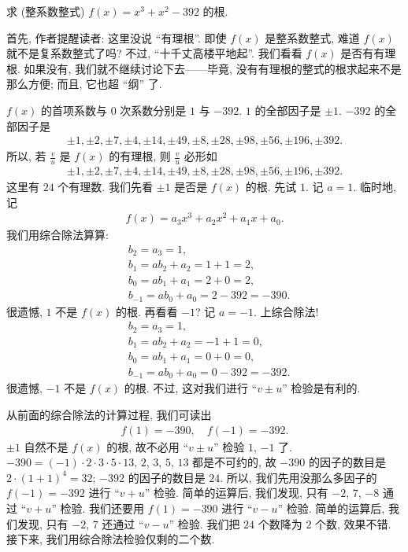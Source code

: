 \begin{example}
    求 (整系数整式) $f(x) = x^3 + x^2 - 392$ 的根.

    首先, 作者提醒读者: 这里没说 ``有理根''. 即使 $f(x)$ 是整系数整式, 难道 $f(x)$ 就不是复系数整式了吗? 不过, ``十千丈高楼平地起''. 我们看看 $f(x)$ 是否有有理根. 如果没有, 我们就不继续讨论下去——毕竟, 没有有理根的整式的根求起来不是那么方便; 而且, 它也超 ``纲'' 了.

    $f(x)$ 的首项系数与 $0$ 次系数分别是 $1$ 与 $-392$. $1$ 的全部因子是 $\pm 1$. $-392$ 的全部因子是
    \begin{align*}
        {\pm 1}, {\pm 2}, {\pm 7}, {\pm 4}, {\pm 14}, {\pm 49}, {\pm 8}, {\pm 28}, {\pm 98}, {\pm 56}, {\pm 196}, {\pm 392}.
    \end{align*}
    所以, 若 $\frac{v}{u}$ 是 $f(x)$ 的有理根, 则 $\frac{v}{u}$ 必形如
    \begin{align*}
        {\pm 1}, {\pm 2}, {\pm 7}, {\pm 4}, {\pm 14}, {\pm 49}, {\pm 8}, {\pm 28}, {\pm 98}, {\pm 56}, {\pm 196}, {\pm 392}.
    \end{align*}
    这里有 $24$ 个有理数. 我们先看 $\pm 1$ 是否是 $f(x)$ 的根. 先试 $1$. 记 $a = 1$. 临时地, 记
    \begin{align*}
        f(x) = a_3 x^3 + a_2 x^2 + a_1 x + a_0.
    \end{align*}
    我们用综合除法算算:
    \begin{align*}
         & b_2 = a_3 = 1,                         \\
         & b_1 = a b_2 + a_2 = 1 + 1 = 2,         \\
         & b_0 = a b_1 + a_1 = 2 + 0 = 2,         \\
         & b_{-1} = a b_0 + a_0 = 2 - 392 = -390.
    \end{align*}
    很遗憾, $1$ 不是 $f(x)$ 的根. 再看看 $-1$? 记 $a = -1$. 上综合除法!
    \begin{align*}
         & b_2 = a_3 = 1,                         \\
         & b_1 = a b_2 + a_2 = -1 + 1 = 0,        \\
         & b_0 = a b_1 + a_1 = 0 + 0 = 0,         \\
         & b_{-1} = a b_0 + a_0 = 0 - 392 = -392.
    \end{align*}
    很遗憾, $-1$ 不是 $f(x)$ 的根. 不过, 这对我们进行 ``$v \pm u$'' 检验是有利的.

    从前面的综合除法的计算过程, 我们可读出
    \begin{align*}
        f(1) = -390, \quad f(-1) = -392.
    \end{align*}
    $\pm 1$ 自然不是 $f(x)$ 的根, 故不必用 ``$v \pm u$'' 检验 $1$, $-1$ 了. $-390 = (-1) \cdot 2 \cdot 3 \cdot 5 \cdot 13$, $2$, $3$, $5$, $13$ 都是不可约的, 故 $-390$ 的因子的数目是 $2 \cdot (1+1)^4 = 32$; $-392$ 的因子的数目是 $24$. 所以, 我们先用没那么多因子的 $f(-1) = -392$ 进行 ``$v + u$'' 检验. 简单的运算后, 我们发现, 只有 $-2$, $7$, $-8$ 通过 ``$v + u$'' 检验. 我们还要用 $f(1) = -390$ 进行 ``$v - u$'' 检验. 简单的运算后, 我们发现, 只有 $-2$, $7$ 还通过 ``$v - u$'' 检验. 我们把 $24$ 个数降为 $2$ 个数, 效果不错. 接下来, 我们用综合除法检验仅剩的二个数.


\end{example}
